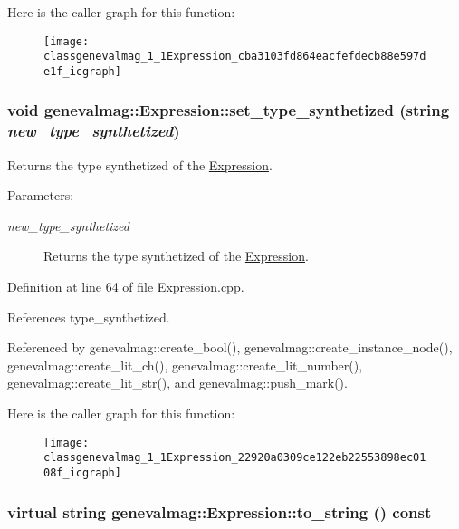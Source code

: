 Here is the caller graph for this function:\nopagebreak
\begin{figure}[H]
\begin{center}
\leavevmode
\texttt{[image: classgenevalmag\_1\_1Expression\_cba3103fd864eacfefdecb88e597de1f\_icgraph]}
\end{center}
\end{figure}
\hypertarget{classgenevalmag_1_1Expression_22920a0309ce122eb22553898ec0108f}{
\subsubsection[{set\_\-type\_\-synthetized}]{\setlength{\rightskip}{0pt plus 5cm}void genevalmag::Expression::set\_\-type\_\-synthetized (string {\em new\_\-type\_\-synthetized})}}
\label{classgenevalmag_1_1Expression_22920a0309ce122eb22553898ec0108f}


Returns the type synthetized of the \hyperlink{classgenevalmag_1_1Expression}{Expression}. \begin{Desc}
\item[Parameters:]
\begin{description}
\item[{\em new\_\-type\_\-synthetized}]Returns the type synthetized of the \hyperlink{classgenevalmag_1_1Expression}{Expression}. \end{description}
\end{Desc}


Definition at line 64 of file Expression.cpp.

References type\_\-synthetized.

Referenced by genevalmag::create\_\-bool(), genevalmag::create\_\-instance\_\-node(), genevalmag::create\_\-lit\_\-ch(), genevalmag::create\_\-lit\_\-number(), genevalmag::create\_\-lit\_\-str(), and genevalmag::push\_\-mark().

Here is the caller graph for this function:\nopagebreak
\begin{figure}[H]
\begin{center}
\leavevmode
\texttt{[image: classgenevalmag\_1\_1Expression\_22920a0309ce122eb22553898ec0108f\_icgraph]}
\end{center}
\end{figure}
\hypertarget{classgenevalmag_1_1Expression_8685f44429501da942b1fe76880af6fe}{
\subsubsection[{to\_\-string}]{\setlength{\rightskip}{0pt plus 5cm}virtual string genevalmag::Expression::to\_\-string () const}}
\label{classgenevalmag_1_1Expression_8685f44429501da942b1fe76880af6fe}


